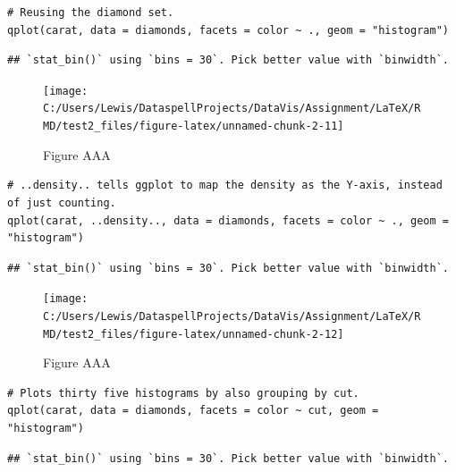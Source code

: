 \begin{verbatim}
# Reusing the diamond set.
qplot(carat, data = diamonds, facets = color ~ ., geom = "histogram")
\end{verbatim}

\begin{verbatim}
## `stat_bin()` using `bins = 30`. Pick better value with `binwidth`.
\end{verbatim}

\begin{figure}[H]

{\centering \texttt{[image: C:/Users/Lewis/DataspellProjects/DataVis/Assignment/LaTeX/RMD/test2\_files/figure-latex/unnamed-chunk-2-11]} 

}

\caption{Figure AAA}\label{fig:unnamed-chunk-2-11}
\end{figure}

\begin{verbatim}
# ..density.. tells ggplot to map the density as the Y-axis, instead of just counting.
qplot(carat, ..density.., data = diamonds, facets = color ~ ., geom = "histogram")
\end{verbatim}

\begin{verbatim}
## `stat_bin()` using `bins = 30`. Pick better value with `binwidth`.
\end{verbatim}

\begin{figure}[H]

{\centering \texttt{[image: C:/Users/Lewis/DataspellProjects/DataVis/Assignment/LaTeX/RMD/test2\_files/figure-latex/unnamed-chunk-2-12]} 

}

\caption{Figure AAA}\label{fig:unnamed-chunk-2-12}
\end{figure}

\begin{verbatim}
# Plots thirty five histograms by also grouping by cut.
qplot(carat, data = diamonds, facets = color ~ cut, geom = "histogram")
\end{verbatim}

\begin{verbatim}
## `stat_bin()` using `bins = 30`. Pick better value with `binwidth`.
\end{verbatim}

